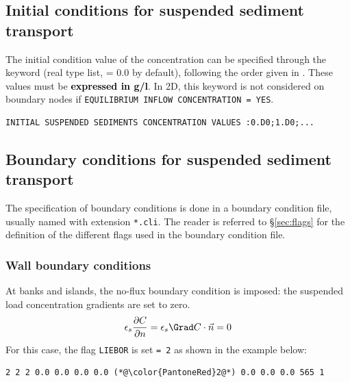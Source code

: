 \subsection{Initial conditions for suspended sediment transport}
The initial condition value of the concentration can be specified through the keyword  (real type list, {\ttfamily = 0.0} by default), following the order given in .
These values must be \textcolor{black}{\bf expressed in g/l}. In 2D, this keyword is not considered on boundary nodes if \texttt{EQUILIBRIUM INFLOW CONCENTRATION = YES}.\\

\begin{lstlisting}[frame=trBL]
INITIAL SUSPENDED SEDIMENTS CONCENTRATION VALUES :0.D0;1.D0;...
\end{lstlisting}

\subsection{Boundary conditions for suspended sediment transport}

The specification of boundary conditions is done in a boundary condition file, usually named with extension \texttt{*.cli}. The reader is referred to \S\ref{sec:flags} for the definition of the different flags used in the boundary condition file.

\subsubsection{Wall boundary conditions}
At banks and islands, the no-flux boundary condition is imposed: the suspended load concentration gradients are set to zero.
\begin{equation}
\label{eq:BC-noflux}
\epsilon_s\frac{\partial C}{\partial n}=\epsilon_s \Grad C \cdot \vec{n}=0
\end{equation}
For this case, the flag \texttt{LIEBOR} is set \texttt{= 2} as shown in the example below:

\begin{lstlisting}[frame=trBL]
2 2 2 0.0 0.0 0.0 0.0 (*@\color{PantoneRed}2@*) 0.0 0.0 0.0 565 1
\end{lstlisting}

